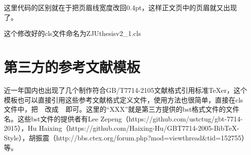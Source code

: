这里代码的区别就在于把页眉线宽度改回0.4pt，这样正文页中的页眉就又出现了。

这个修改好的cls文件命名为ZJUthesisv2\_1.cls


\section{第三方的参考文献模板}

近一年国内也出现了几个制作符合GB/T7714-2105文献格式引用标准TeXer，这个模板也可以直接引用这些参考文献格式定义文件，使用方法也很简单，直接在cls文件中，把\verb+  +改成\verb+  +即可。这里的“XXX”就是第三方提供的bst格式文件的文件名。这些bst文件的提供者有Lee Zepeng（https://github.com/ustctug/gbt-7714-2015），Hu Haixing（https://github.com/Haixing-Hu/GBT7714-2005-BibTeX-Style），胡振震（http://bbs.ctex.org/forum.php?mod=viewthread\&tid=152755）等。
